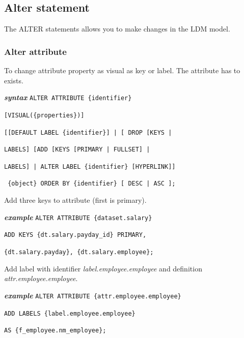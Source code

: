 \documentclass[a4paper, 12pt, titlepage, fleqn]{article}
\begin{document}
\subsection{Alter statement}
The ALTER statements allows you to make changes in the LDM model.

\subsubsection{Alter attribute}
\label{alter}
To change attribute property as visual as key or label. The attribute has to exists.

\textbf{\emph{syntax}}  \hspace{.9cm}\verb=ALTER ATTRIBUTE {identifier}=

\hspace{2.2cm}\verb=[VISUAL({properties})]=

\hspace{2.2cm}\verb=[[DEFAULT LABEL {identifier}] | [ DROP [KEYS |=

\hspace{2.2cm}\verb=LABELS] [ADD [KEYS [PRIMARY | FULLSET] |=

\hspace{2.2cm}\verb=LABELS] | ALTER LABEL {identifier} [HYPERLINK]]=

\hspace{2.2cm}\verb= {object} ORDER BY {identifier} [ DESC | ASC ];=

\noindent Add three keys to attribute (first is primary).

\textbf{\emph{example}}  \hspace{.9cm}\verb=ALTER ATTRIBUTE {dataset.salary}=

\hspace{2.5cm}\verb=ADD KEYS {dt.salary.payday_id} PRIMARY,=

\hspace{2.5cm}\verb={dt.salary.payday}, {dt.salary.employee};=

\noindent Add label with identifier \emph{label.employee.employee} and definition \emph{attr.employee.employee}.

\textbf{\emph{example}}  \hspace{.9cm}\verb=ALTER ATTRIBUTE {attr.employee.employee}=

\hspace{2.5cm}\verb=ADD LABELS {label.employee.employee}=

\hspace{2.5cm}\verb=AS {f_employee.nm_employee};=
\end{document}
